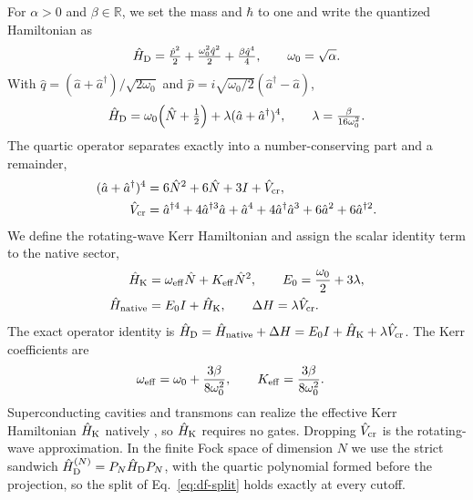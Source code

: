 \documentclass[pra,twocolumn,superscriptaddress,nofootinbib,floatfix]{revtex4-2}
\theoremstyle{remark}
\newcommand{\revcolor}{\color{blue}}
\DeclareRobustCommand{\rev}[1]{{\revcolor #1}}
\begin{document}
For \(\alpha>0\) and \(\beta\in\mathbb{R}\), we set the mass and \(\hbar\) to one and write the quantized Hamiltonian as
\begin{align}
\hat H_{\rm D}=\tfrac{\hat p^2}{2}+\tfrac{\omega_0^2\hat q^2}{2}+\tfrac{\beta\hat q^4}{4},\qquad\omega_0=\sqrt\alpha .
\label{eq:df-ham}
\end{align}
With $\hat q=(\hat a+\hat a^\dagger)/\sqrt{2\omega_0}$ and $\hat p=i\sqrt{\omega_0/2}(\hat a^\dagger-\hat a)$,
\begingroup\revcolor
\begin{align}
\hat H_{\rm D}=\omega_0\Bigl(\hat N+\tfrac12\Bigr)+\lambda(\hat a+\hat a^\dagger)^4,\qquad\lambda=\tfrac{\beta}{16\omega_0^2}.
\end{align}
\endgroup
The quartic operator separates exactly into a number-conserving part and a remainder,
\begingroup\revcolor
\begin{align}
(\hat a+\hat a^\dagger)^4&=6\hat N^2+6\hat N+3I+\hat V_{\rm cr},\nonumber\\
\hat V_{\rm cr}&=\hat a^{\dagger4}+4\hat a^{\dagger3}\hat a+\hat a^4+4\hat a^\dagger\hat a^3+6\hat a^2+6\hat a^{\dagger2}.
\label{eq:df-vcr}
\end{align}
\endgroup
We define the rotating-wave Kerr Hamiltonian and assign the scalar identity term to the native sector,
\begingroup\revcolor
\begin{align}
\hat H_{\rm K} &= \omega_{\rm eff}\hat N+K_{\rm eff}\hat N^2,\qquad E_0=\frac{\omega_0}{2}+3\lambda,\\
\hat H_{\rm native} &= E_0 I+\hat H_{\rm K},\qquad \Delta H=\lambda\hat V_{\rm cr}.
\label{eq:df-split}
\end{align}
\endgroup
The exact operator identity is \(\hat H_{\rm D}=\hat H_{\rm native}+\Delta H=E_0 I+\hat H_{\rm K}+\lambda\hat V_{\rm cr}\). The Kerr coefficients are
\begin{align}
\omega_{\rm eff} &= \omega_0+\frac{3\beta}{8\omega_0^2},\qquad K_{\rm eff}=\frac{3\beta}{8\omega_0^2}.
\label{eq:df-fock-kerr}
\end{align}
Superconducting cavities and transmons can realize the effective Kerr Hamiltonian \(\hat H_{\rm K}\) natively \cite{Drummond1980QuantumTO, Koch_2007, Blais_2021}, so $\hat H_{\rm K}$ requires no gates. Dropping $\hat V_{\rm cr}$ is the rotating-wave approximation. \rev{In the finite Fock space of dimension \(N\) we use the strict sandwich \(\hat H_{\rm D}^{(N)}=P_N\hat H_{\rm D}P_N\), with the quartic polynomial formed before the projection, so the split of Eq.~\eqref{eq:df-split} holds exactly at every cutoff.}
\end{document}
